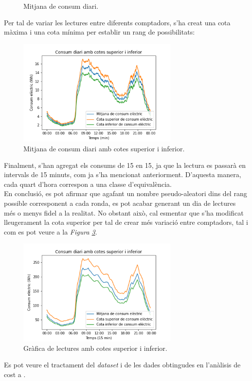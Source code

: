 \begin{itemize}
\begin{figure}[H]
	\caption{Mitjana de consum diari.}
	\label{fig:consumptionmin1}
\end{figure}
Per tal de variar les lectures entre diferents comptadors, s'ha creat una cota màxima i una cota mínima per establir un rang de possibilitats:
\begin{figure}[H]
	\centering
	\includegraphics[width=8cm]{imgs/cost/consumptionmin2.png}
	\caption{Mitjana de consum diari amb cotes superior i inferior.}
	\label{fig:consumptionmin2}
\end{figure}
Finalment,  s'han agregat els consums de 15 en 15, ja que la lectura es passarà en intervals de 15 minuts, com ja s'ha mencionat anteriorment. D'aquesta manera, cada quart d'hora correspon a una classe d'equivalència. \\
En conclusió, es pot afirmar que agafant un nombre pseudo-aleatori dins del rang possible corresponent a cada ronda, es pot acabar generant un dia de lectures més o menys fidel a la realitat. No obstant això, cal esmentar que s'ha modificat lleugerament la cota superior per tal de crear més variació entre comptadors, tal i com es pot veure a la \textit{Figura \ref{fig:consumption2}}.
\begin{figure}[H]
	\centering
	\includegraphics[width=8cm]{imgs/cost/consumption2.png}
	\caption{Gràfica de lectures amb cotes superior i inferior.}
	\label{fig:consumption2}
\end{figure}
\end{itemize}
Es pot veure el tractament del \textit{dataset} i de les dades obtingudes en l'anàlisis de cost a \cite{lab-recsi}.
